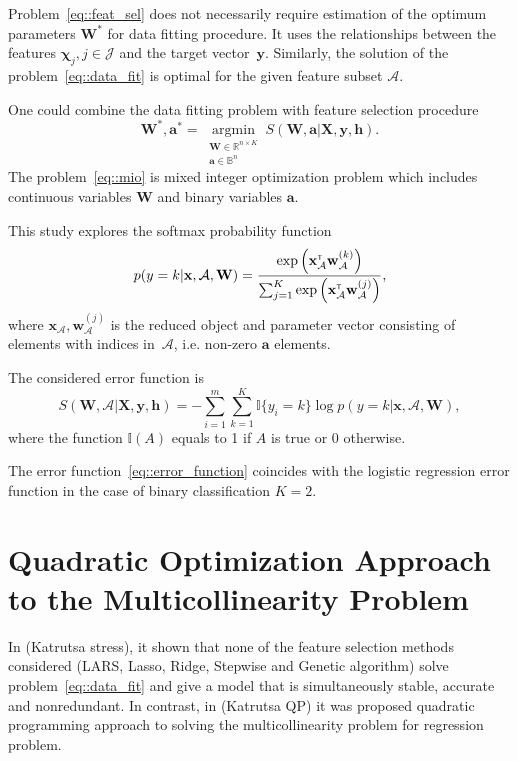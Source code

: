 \documentclass[a4paper,12pt]{article}
\theoremstyle{plain} %
\theoremstyle{definition} %
\theoremstyle{remark} %
\newcommand{\bw}{\mathbf{w}}
\newcommand{\bW}{\mathbf{W}}
\newcommand{\bx}{\mathbf{x}}
\newcommand{\bX}{\mathbf{X}}
\newcommand{\by}{\mathbf{y}}
\newcommand{\ba}{\mathbf{a}}
\newcommand{\cA}{\mathcal{A}}
\newcommand{\bchi}{\boldsymbol{\chi}}
\newcommand{\T}{{\text{\tiny\sffamily\upshape\mdseries T}}}
\newcommand{\argmin}{\mathop{\arg \min}\limits}
\begin{document}
	Problem~\eqref{eq::feat_sel} does not necessarily require estimation of the optimum parameters $\bW^*$ for data fitting procedure.
	It uses the relationships between the features $\bchi_j, j \in \mathcal{J}$ and the target vector~$\by$.  Similarly, the solution of the problem~\eqref{eq::data_fit} is optimal for the given feature subset $\cA$. 
	
	One could combine the data fitting problem with feature selection procedure
	\begin{equation}
		\bW^*, \ba^* = \argmin_{\substack{\bW \in \mathbb{R}^{n \times K} \\ \ba \in \mathbb{B}^{n}}} S\left(\bW, \ba | \bX, \by, \mathbf{h}\right).
		\label{eq::mio}
	\end{equation}
	The problem~\eqref{eq::mio} is mixed integer optimization problem which includes continuous variables $\bW$ and binary variables $\ba$.
	
	This study explores the softmax probability function
	\[
	p(y=k | \bx, \cA, \bW) = \frac{\exp\left(\bx_{\cA}^{\T} \bw_{\cA}^{(k)}\right)}{\sum_{j=1}^K \exp \left( \bx_{\cA}^{\T} \bw_{\cA}^{(j)} \right)},
	\]
	where $\bx_{\cA}, \bw^{(j)}_{\cA}$ is the reduced object and parameter vector consisting of elements with indices in~$\cA$, i.e. non-zero $\ba$ elements. 
	
	The considered error function is 
	\begin{equation}
		S(\bW, \cA |\bX, \mathbf{y}, \mathbf{h}) = - \sum_{i=1}^m \sum_{k=1}^{K} \mathbb{I}\{y_i=k\} \log p(y=k | \bx, \cA, \bW),
		\label{eq::error_function}
	\end{equation}
	where the function $\mathbb{I}(A)$ equals to 1 if $A$ is true or 0 otherwise.
	
	The error function~\eqref{eq::error_function} coincides with the logistic regression error function in the case of binary classification $K = 2$.
	
	\section{Quadratic Optimization Approach to the Multicollinearity Problem}
	In (Katrutsa stress), it shown that none of the  feature selection methods considered (LARS, Lasso, Ridge, Stepwise and Genetic algorithm) solve problem~\eqref{eq::data_fit} and give a model that is simultaneously stable, accurate and nonredundant.
	In contrast, in (Katrutsa QP) it was proposed quadratic programming approach to solving the multicollinearity problem for regression problem.
	
\end{document}

